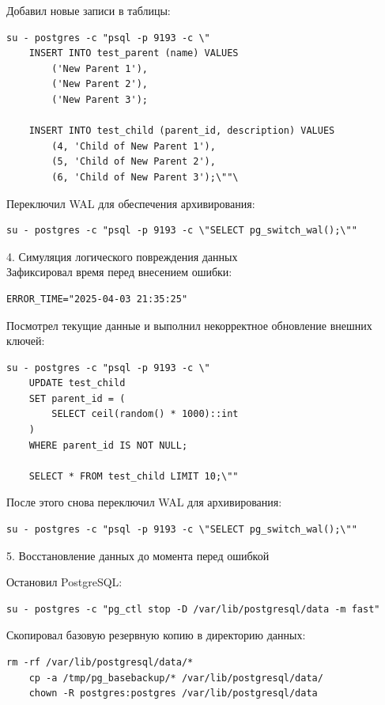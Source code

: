 \documentclass{article}
\begin{document}
Добавил новые записи в таблицы:
\begin{lstlisting}[caption={kitty}, label={lst:example}]
    su - postgres -c "psql -p 9193 -c \"
    INSERT INTO test_parent (name) VALUES 
        ('New Parent 1'),
        ('New Parent 2'),
        ('New Parent 3');
        
    INSERT INTO test_child (parent_id, description) VALUES 
        (4, 'Child of New Parent 1'),
        (5, 'Child of New Parent 2'),
        (6, 'Child of New Parent 3');\""\
\end{lstlisting}

Переключил WAL для обеспечения архивирования:
\begin{lstlisting}[caption={kitty}, label={lst:example}]
    su - postgres -c "psql -p 9193 -c \"SELECT pg_switch_wal();\""
\end{lstlisting}

4. Симуляция логического повреждения данных
\\
Зафиксировал время перед внесением ошибки:
\begin{lstlisting}[caption={kitty}, label={lst:example}]
    ERROR_TIME="2025-04-03 21:35:25"
\end{lstlisting}

Посмотрел текущие данные и выполнил некорректное обновление внешних ключей:

\begin{lstlisting}[caption={kitty}, label={lst:example}]
    su - postgres -c "psql -p 9193 -c \"
    UPDATE test_child
    SET parent_id = (
        SELECT ceil(random() * 1000)::int
    )
    WHERE parent_id IS NOT NULL;

    SELECT * FROM test_child LIMIT 10;\""
\end{lstlisting}




После этого снова переключил WAL для архивирования:
\begin{lstlisting}[caption={kitty}, label={lst:example}]
    su - postgres -c "psql -p 9193 -c \"SELECT pg_switch_wal();\""
\end{lstlisting}

5. Восстановление данных до момента перед ошибкой

Остановил PostgreSQL:
\begin{lstlisting}[caption={kitty}, label={lst:example}]
    su - postgres -c "pg_ctl stop -D /var/lib/postgresql/data -m fast"
\end{lstlisting}

Скопировал базовую резервную копию в директорию данных:
\begin{lstlisting}[caption={kitty}, label={lst:example}]
    rm -rf /var/lib/postgresql/data/*
    cp -a /tmp/pg_basebackup/* /var/lib/postgresql/data/
    chown -R postgres:postgres /var/lib/postgresql/data
\end{lstlisting}
\end{document}
